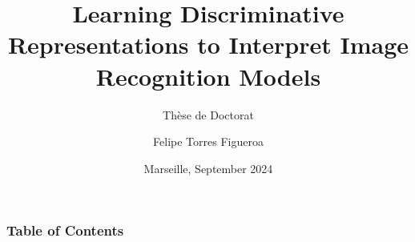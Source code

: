 \documentclass[xcolor=dvipsnames]{beamer}
\title[] %
{Learning Discriminative Representations to Interpret Image Recognition Models}
\subtitle{Thèse de Doctorat}
\author[Felipe Torres Figueroa] %
{Felipe Torres Figueroa}
\institute[ECM] %
{
  \'Ecole Centrale de Marseille
  \and
  Laboratoire d'Informatique et de Syst\`emes (LIS)
}
\date[2024] %
{Marseille, September 2024}
\begin{document}
	{
	\begin{frame}
		\maketitle
	\end{frame}
	}
	\logo{}
	\begin{frame}
		\frametitle{Table of Contents}
		\tableofcontents
	\end{frame}
	
	
	
	
	
	
\end{document}
